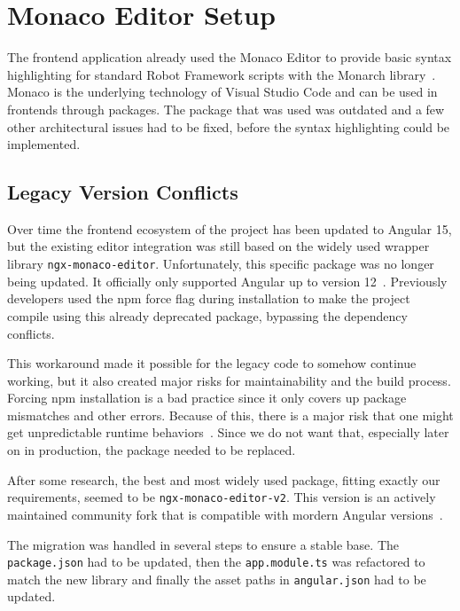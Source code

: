 \section{Monaco Editor Setup}

The frontend application already used the Monaco Editor to provide basic syntax highlighting for standard Robot Framework scripts with the Monarch library~\cite{MonacoGithub, MonacoMonarchDocs}.
Monaco is the underlying technology of Visual Studio Code and can be used in frontends through packages. The package that was used was outdated and a few other architectural issues had to be fixed, before the syntax highlighting could be implemented.

\subsection{Legacy Version Conflicts}

Over time the frontend ecosystem of the project has been updated to Angular 15, but the existing editor integration was still based on the widely used wrapper library \texttt{ngx-monaco-editor}. Unfortunately, this specific package was no longer being updated.  It officially only supported Angular up to version 12~\cite{DeprecatedNgxMonaco}. Previously developers used the npm force flag during installation to make the project compile using this already deprecated package, bypassing the dependency conflicts.

This workaround made it possible for the legacy code to somehow continue working, but it also created major risks for maintainability and the build process. Forcing npm installation is a bad practice since it only covers up package mismatches and other errors. Because of this, there is a major risk that one might get unpredictable runtime behaviors~\cite{npmForceDocs}. Since we do not want that, especially later on in production, the package needed to be replaced.

After some research, the best and most widely used package, fitting exactly our requirements, seemed to be \texttt{ngx-monaco-editor-v2}. This version is an actively maintained community fork that is compatible with mordern Angular versions~\cite{NgxMonacoEditorV2}.

The migration was handled in several steps to ensure a stable base. The \texttt{package.json} had to be updated, then the \texttt{app.module.ts} was refactored to match the new library and finally the asset paths in \texttt{angular.json} had to be updated.


